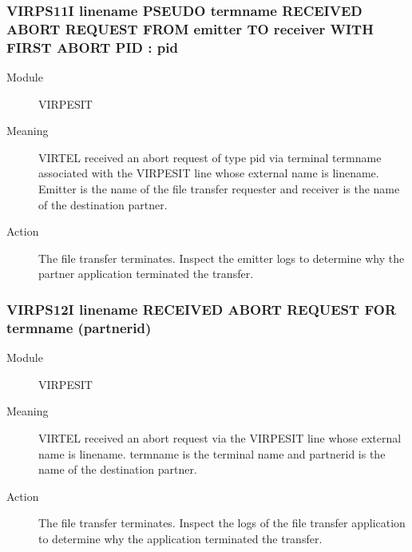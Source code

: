 \documentclass[letterpaper,10pt,english]{sphinxmanual}
\begin{document}
\subsubsection{VIRPS11I linename PSEUDO termname RECEIVED ABORT REQUEST FROM emitter TO receiver WITH FIRST ABORT PID : pid}
\label{\detokenize{messages:virps11i-linename-pseudo-termname-received-abort-request-from-emitter-to-receiver-with-first-abort-pid-pid}}\begin{description}
\item[{Module}] \leavevmode
VIRPESIT

\item[{Meaning}] \leavevmode
VIRTEL received an abort request of type pid via terminal termname associated with the VIRPESIT line whose external name is linename. Emitter is the name of the file transfer requester and receiver is the name of the destination partner.

\item[{Action}] \leavevmode
The file transfer terminates. Inspect the emitter logs to determine why the partner application terminated the transfer.

\end{description}


\subsubsection{VIRPS12I linename RECEIVED ABORT REQUEST FOR termname (partnerid)}
\label{\detokenize{messages:virps12i-linename-received-abort-request-for-termname-partnerid}}\begin{description}
\item[{Module}] \leavevmode
VIRPESIT

\item[{Meaning}] \leavevmode
VIRTEL received an abort request via the VIRPESIT line whose external name is linename. termname is the terminal name and partnerid is the name of the destination partner.

\item[{Action}] \leavevmode
The file transfer terminates. Inspect the logs of the file transfer application to determine why the application terminated the transfer.

\end{description}
\end{document}
